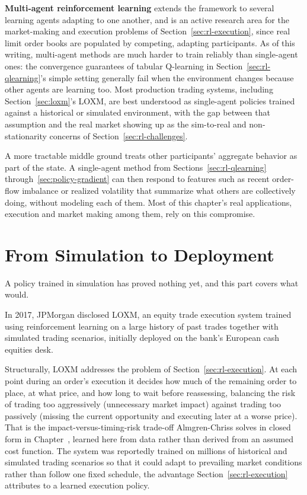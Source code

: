 \documentclass[../ai_in_finance]{subfiles}
\begin{document}
\textbf{Multi-agent reinforcement learning} extends the framework to several learning agents adapting to one another, and is an active research area for the market-making and execution problems of Section~\ref{sec:rl-execution}, since real limit order books are populated by competing, adapting participants. As of this writing, multi-agent methods are much harder to train reliably than single-agent ones: the convergence guarantees of tabular Q-learning in Section~\ref{sec:rl-qlearning}'s simple setting generally fail when the environment changes because other agents are learning too. Most production trading systems, including Section~\ref{sec:loxm}'s LOXM, are best understood as single-agent policies trained against a historical or simulated environment, with the gap between that assumption and the real market showing up as the sim-to-real and non-stationarity concerns of Section~\ref{sec:rl-challenges}.

A more tractable middle ground treats other participants' aggregate behavior as part of the state. A single-agent method from Sections~\ref{sec:rl-qlearning} through~\ref{sec:policy-gradient} can then respond to features such as recent order-flow imbalance or realized volatility that summarize what others are collectively doing, without modeling each of them. Most of this chapter's real applications, execution and market making among them, rely on this compromise.

\section{From Simulation to Deployment}

A policy trained in simulation has proved nothing yet, and this part covers what would.

\label{sec:loxm}

In 2017, JPMorgan disclosed LOXM, an equity trade execution system trained using reinforcement learning on a large history of past trades together with simulated trading scenarios, initially deployed on the bank's European cash equities desk.

Structurally, LOXM addresses the problem of Section~\ref{sec:rl-execution}. At each point during an order's execution it decides how much of the remaining order to place, at what price, and how long to wait before reassessing, balancing the risk of trading too aggressively (unnecessary market impact) against trading too passively (missing the current opportunity and executing later at a worse price). That is the impact-versus-timing-risk trade-off Almgren-Chriss solves in closed form in Chapter~, learned here from data rather than derived from an assumed cost function. The system was reportedly trained on millions of historical and simulated trading scenarios so that it could adapt to prevailing market conditions rather than follow one fixed schedule, the advantage Section~\ref{sec:rl-execution} attributes to a learned execution policy.
\end{document}
